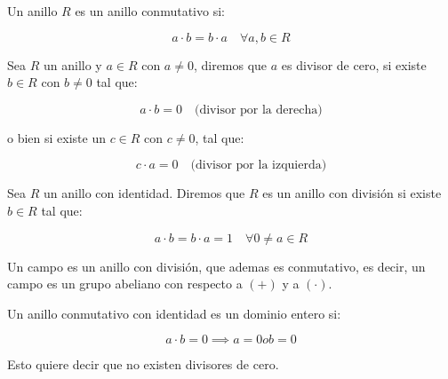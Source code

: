     \begin{definicion}
        Un anillo $R$ es un anillo conmutativo si:

        \begin{equation}
            a \cdot b = b \cdot a \quad \forall a, b \in R
        \end{equation}
    \end{definicion}

    \begin{definicion}
        Sea $R$ un anillo y $a \in R$ con $a \ne 0$, diremos que $a$ es divisor de cero, si existe $b \in R$ con $b \ne 0$ tal que:

        \begin{equation}
            a \cdot b = 0 \quad \text{(divisor por la derecha)}
        \end{equation}

        o bien si existe un $c \in R$ con $c \ne 0$, tal que:

        \begin{equation}
            c \cdot a = 0 \quad \text{(divisor por la izquierda)}
        \end{equation}
    \end{definicion}

    \begin{definicion}
        Sea $R$ un anillo con identidad. Diremos que $R$ es un anillo con división si existe $b \in R$ tal que:

        \begin{equation}
            a \cdot b = b \cdot a = 1 \quad \forall 0 \ne a \in R
        \end{equation}
    \end{definicion}

    \begin{definicion}
        Un campo es un anillo con división, que ademas es conmutativo, es decir, un campo es un grupo abeliano con respecto a $(+)$ y a $(\cdot)$.
    \end{definicion}

    \begin{definicion}
        Un anillo conmutativo con identidad es un dominio entero si:

        \begin{equation}
            a \cdot b = 0 \implies a = 0 o b = 0
        \end{equation}

        Esto quiere decir que no existen divisores de cero.
    \end{definicion}

